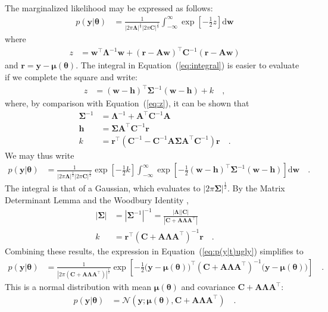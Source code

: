 \documentclass[modern]{rnaastex}
\renewcommand{\eqref}[1]{\ref{eq:#1}}
\newcommand{\Eq}[1]{Equation~(\eqref{#1})}
\newcommand{\eq}[1]{\Eq{#1}}
\newcommand{\eqlabel}[1]{\label{eq:#1}}
\newcommand{\dd}{\ensuremath{ \mathrm{d}}}
\newcommand{\bvec}[1]{{\ensuremath{\boldsymbol{#1}}}}
\newcommand{\Normal}{\ensuremath{\mathcal{N}}}
\newcommand{\mA}{\ensuremath{\bvec{A}}}
\newcommand{\mC}{\ensuremath{\bvec{C}}}
\newcommand{\mS}{\ensuremath{\bvec{\Sigma}}}
\newcommand{\mL}{\ensuremath{\bvec{\Lambda}}}
\newcommand{\vw}{\ensuremath{\bvec{w}}}
\newcommand{\vy}{\ensuremath{\bvec{y}}}
\newcommand{\vt}{\ensuremath{\bvec{\theta}}}
\newcommand{\vm}{\ensuremath{\bvec{\mu}(\bvec{\theta})}}
\newcommand{\vre}{\ensuremath{\bvec{r}}}
\newcommand{\vh}{\ensuremath{\bvec{h}}}
\begin{document}
The marginalized likelihood may be expressed as follows:
\begin{align}
\eqlabel{integral}
p(\vy | \vt) &= \frac{1}{|2\pi\mL|^\frac{1}{2} |2\pi\mC|^\frac{1}{2}}
                \int_{-\infty}^{\infty} \exp \left[ -\frac{1}{2} z \right] \dd\vw
\end{align}
%
where
%
\begin{align}
\eqlabel{z}
z &= \vw^\top \mL^{-1} \vw + (\vre - \mA \vw)^\top \mC^{-1} (\vre - \mA \vw)
\end{align}
%
and $\vre = \vy - \vm$.
%
The integral in \eq{integral} is easier to evaluate if we
complete the square and write:
%
\begin{align}
\eqlabel{z_square}
z &= (\vw - \vh)^\top \mS^{-1} (\vw - \vh) + k \quad,
\end{align}
%
where, by comparison with \eq{z}, it can be shown that
%
\begin{align}
\mS^{-1} &= \mL^{-1} + \mA^\top \mC^{-1} \mA \\
%
\vh &= \bvec{\Sigma} \mA^\top \mC^{-1} \vre \\
%
k &= \vre^\top \left( \mC^{-1} - \mC^{-1} \mA \mS \mA^\top \mC^{-1} \right) \vre
    \quad.
\end{align}
%
We may thus write
%
\begin{align}
\eqlabel{p(y|t)ugly}
p(\vy | \vt) &= \frac{1}{
                |2\pi\mL|^\frac{1}{2}
                |2\pi\mC|^\frac{1}{2}}
                \exp \left[ -\frac{1}{2}k \right]
                \int_{-\infty}^{\infty} \exp
                \left[-\frac{1}{2}(\vw - \vh)^\top \mS^{-1} (\vw - \vh)
                \right] \dd\vw \quad.
\end{align}
%
The integral is that of a Gaussian, which evaluates to
$|2\pi\bvec{\Sigma}|^\frac{1}{2}$.
By the Matrix Determinant Lemma and the Woodbury Identity
\citep[for example,][]{Woodbury:1950, Harville:1997},
%
\begin{align}
|\mS| &= {|\mS^{-1}|}^{-1} = \frac{|\mL| |\mC|}{|\mC + \mA \mL \mA^\top|} \nonumber \\
k &= \vre^\top \left( \mC + \mA \mL \mA^\top \right)^{-1} \vre \quad.
\end{align}
%
Combining these results, the expression in \eq{p(y|t)ugly} simplifies to
\begin{align}
\eqlabel{p(y|t)exp}
p(\vy | \vt) &= \frac{1}{
                |2\pi(\mC + \mA \mL \mA^\top)|^\frac{1}{2}}
                \exp \left[ -\frac{1}{2} \big( \vy - \vm \big)^\top
                            (\mC + \mA \mL \mA^\top)^{-1}
                            \big( \vy - \vm \big)
                     \right] \quad.
\end{align}
%
This is a normal distribution with mean $\vm$ and covariance
$\mC + \mA \mL \mA^\top$:
%
\begin{align}
\eqlabel{p(y|t)normal}
p(\vy | \vt) &= \Normal (\vy; \vm, \mC + \mA \mL \mA^\top) \quad.
\end{align}
\end{document}
